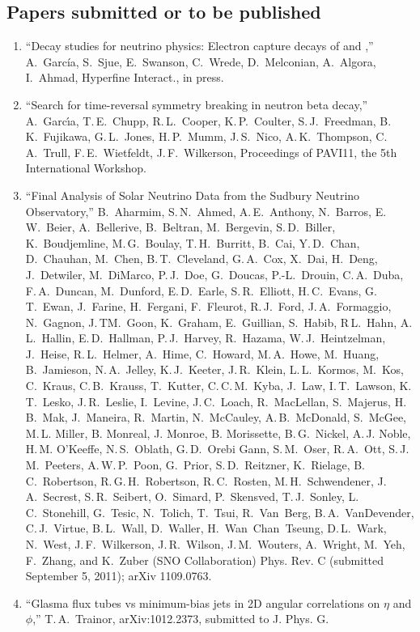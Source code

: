 %
%  
%
\subsection{Papers submitted or to be published}
%
%
%
\begin{enumerate} %

\item ``Decay studies for neutrino physics: Electron capture decays of  and ,'' A.~Garc{\'i}a, S.~Sjue, E.~Swanson, C.~Wrede, D.~Melconian, A.~Algora, I.~Ahmad, Hyperfine Interact., in press.



\item ``Search for time-reversal symmetry breaking in neutron beta decay,'' A.~Garc\'{\i}a, T.\,E.~Chupp, R.\,L.~Cooper, K.\,P.~Coulter, S.\,J.~Freedman, B.\,K.~Fujikawa, G.\,L.~Jones, H.\,P.~Mumm, J.\,S.~Nico, A.\,K.~Thompson, C.\,A.~Trull, F.\,E.~Wietfeldt, J.\,F.~Wilkerson, Proceedings of PAVI11, the 5th International Workshop.

\item ``Final Analysis of Solar Neutrino Data from the Sudbury Neutrino Observatory,'' B.~Aharmim, S.\,N.~Ahmed, A.\,E.~Anthony, N.~Barros, E.\,W.~Beier, A.~Bellerive, B.~Beltran, M.~Bergevin, S.\,D.~Biller, K.~Boudjemline, M.\,G.~Boulay, T.\,H.~Burritt, B.~Cai, Y.\,D.~Chan, D.~Chauhan, M.~Chen, B.\,T.~Cleveland, G.\,A.~Cox, X.~Dai, H.~Deng, J.~Detwiler, M.~DiMarco, P.\,J.~Doe, G.~Doucas, P.-L.~Drouin, C.\,A.~Duba, F.\,A.~Duncan, M.~Dunford, E.\,D.~Earle, S.\,R.~Elliott, H.\,C.~Evans, G.\,T.~Ewan, J.~Farine, H.~Fergani, F.~Fleurot, R.\,J.~Ford, J.\,A.~Formaggio, N.~Gagnon, J.\,TM.~Goon, K.~Graham, E.~Guillian, S.~Habib, R\,L.~Hahn, A.\,L.~Hallin, E.\,D.~Hallman, P.\,J.~Harvey, R.~Hazama, W.\,J.~Heintzelman, J.~Heise, R.\,L.~Helmer, A.~Hime, C.~Howard, M.\,A.~Howe, M.~Huang, B.~Jamieson, N.\,A.~Jelley, K.\,J.~Keeter, J.\,R.~Klein, L.\,L.~Kormos, M.~Kos, C.~Kraus, C.\,B.~Krauss, T.~Kutter, C.\,C.\,M.~Kyba, J.~Law, I.\,T.~Lawson, K.\,T.~Lesko, J.\,R.~Leslie, I.~Levine, J.\,C.~Loach, R.~MacLellan, S.~Majerus, H.\,B.~Mak, J.~Maneira, R.~Martin, N.~McCauley, A.\,B.~McDonald, S.~McGee, M.\,L. Miller, B. Monreal, J. Monroe, B. Morissette, B.\,G.~Nickel, A.\,J. Noble, H.\,M. O'Keeffe, N.\,S.~Oblath, G.\,D.~Orebi Gann, S.\,M.~Oser, R.\,A.~Ott, S.\,J.\,M.~Peeters, A.\,W.\,P.~Poon, G.~Prior, S.\,D.~Reitzner, K.~Rielage, B.\,C.~Robertson, R.\,G.\,H.~Robertson, R.\,C.~Rosten, M.\,H.~Schwendener, J.\,A.~Secrest, S.\,R.~Seibert, O.~Simard, P.~Skensved, T.\,J.~Sonley, L.\,C.~Stonehill, G.~Tesic, N.~Tolich, T.~Tsui, R.~Van~Berg, B.\,A.~VanDevender, C.\,J.~Virtue, B.\,L.~Wall, D.~Waller, H.~Wan~Chan~Tseung, D.\,L.~Wark, N.~West, J.\,F.~Wilkerson, J.\,R.~Wilson, J.\,M.~Wouters, A.~Wright, M.~Yeh, F.~Zhang, and K.~Zuber (SNO Collaboration) Phys. Rev. C (submitted September 5, 2011); arXiv 1109.0763. 

\item ``Glasma flux tubes vs minimum-bias jets in 2D angular correlations on $\eta$ and $\phi$,''  T.\,A.~Trainor, arXiv:1012.2373, submitted to J. Phys. G.

\end{enumerate} %


